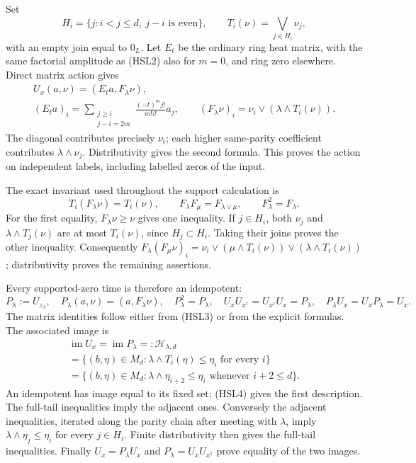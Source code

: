 Set
\[
 H_i=\{j:i<j\le d,\ j-i\text{ is even}\},\qquad
 T_i(\nu)=\bigvee_{j\in H_i}\nu_j,
\]
with an empty join equal to $0_L$. Let $E_t$ be the ordinary
ring heat matrix, with the same factorial amplitude as (HSL2)
also for $m=0$, and ring zero elsewhere. Direct matrix action gives
\begin{equation}\tag{HSL4}
 \begin{gathered}
 U_x(a,\nu)=(E_ta,F_\lambda\nu),\\
 (E_ta)_i=\sum_{\substack{j\ge i\\j-i=2m}}
                 \frac{(-t)^m j!}{m!i!}a_j,\qquad
 (F_\lambda\nu)_i=\nu_i\vee(\lambda\wedge T_i(\nu)).
 \end{gathered}
\end{equation}
The diagonal contributes precisely $\nu_i$; each higher
same-parity coefficient contributes $\lambda\wedge\nu_j$.
Distributivity gives the second formula. This proves the action
on independent labels, including labelled zeros of the input.

The exact invariant used throughout the support calculation is
\begin{equation}\tag{HSL5}
 T_i(F_\lambda\nu)=T_i(\nu),\qquad
 F_\lambda F_\mu=F_{\lambda\vee\mu},\qquad
 F_\lambda^2=F_\lambda.
\end{equation}
For the first equality, $F_\lambda\nu\ge\nu$ gives one
inequality. If $j\in H_i$, both $\nu_j$ and
$\lambda\wedge T_j(\nu)$ are at most $T_i(\nu)$, since
$H_j\subset H_i$. Taking their joins proves the other inequality.
Consequently
$F_\lambda(F_\mu\nu)_i=
\nu_i\vee(\mu\wedge T_i(\nu))\vee(\lambda\wedge T_i(\nu))$;
distributivity proves the remaining assertions.

Every supported-zero time is therefore an idempotent:
\begin{equation}\tag{HSL6}
 P_\lambda:=U_{z_\lambda},\quad
 P_\lambda(a,\nu)=(a,F_\lambda\nu),\quad
 P_\lambda^2=P_\lambda,\quad
 U_xU_{x^\dagger}=U_{x^\dagger}U_x=P_\lambda,\quad
 P_\lambda U_x=U_xP_\lambda=U_x.
\end{equation}
The matrix identities follow either from (HSL3) or from the
explicit formulas. The associated image is
\begin{equation}\tag{HSL7}
 \begin{gathered}
 \operatorname{im}U_x=\operatorname{im}P_\lambda
 =:\mathcal H_{\lambda,d}\\
 =\{(b,\eta)\in M_d:
       \lambda\wedge T_i(\eta)\le\eta_i\text{ for every }i\}\\
 =\{(b,\eta)\in M_d:
       \lambda\wedge\eta_{i+2}\le\eta_i
                         \text{ whenever }i+2\le d\}.
 \end{gathered}
\end{equation}
An idempotent has image equal to its fixed set; (HSL4) gives
the first description. The full-tail inequalities imply the
adjacent ones. Conversely the adjacent inequalities, iterated
along the parity chain after meeting with $\lambda$, imply
$\lambda\wedge\eta_j\le\eta_i$ for every $j\in H_i$.
Finite distributivity then gives the full-tail inequalities.
Finally $U_x=P_\lambda U_x$ and
$P_\lambda=U_xU_{x^\dagger}$ prove equality of the two images.

